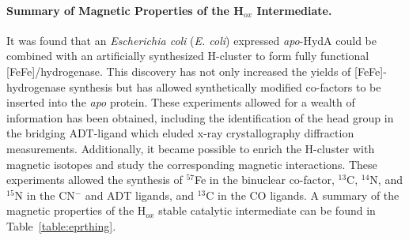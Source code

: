 \paragraph{Summary of Magnetic Properties of the H$_{ox}$ Intermediate.} It was found that an \textit{Escherichia coli} (\textit{E. coli}) expressed \textit{apo}-HydA could be combined with an artificially synthesized H-cluster to form fully functional [FeFe]\-/hydrogenase. \cite{EsselbornArtificial, BirrellArtificial} This discovery has not only increased the yields of [FeFe]-hydrogenase synthesis but has allowed synthetically modified co-factors to be inserted into the \textit{apo} protein. These experiments allowed for a wealth of information has been obtained, including the identification of the head group in the bridging ADT-ligand which eluded x-ray crystallography diffraction measurements. \cite{AdamskaBridgingAmine} Additionally, it became possible to enrich the H-cluster with magnetic isotopes and study the corresponding magnetic interactions. These experiments allowed the synthesis of $^{57}$Fe in the binuclear  co-factor, $^{13}$C, $^{14}$N, and $^{15}$N in the CN$^-$ and ADT ligands, and $^{13}$C in the CO ligands. A summary of the magnetic properties of the H$_{ox}$ stable catalytic intermediate can be found in Table~\ref{table:eprthing}. 


